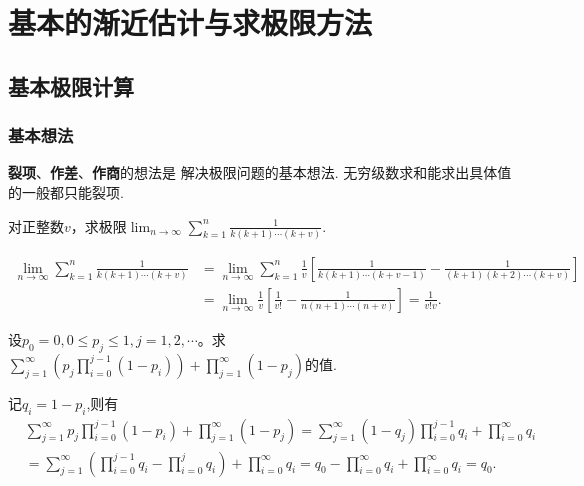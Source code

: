 \documentclass[../../main.tex]{subfiles}%
\begin{document}
\section{基本的渐近估计与求极限方法}

\subsection{基本极限计算}

\subsubsection{基本想法}

\textbf{裂项}、\textbf{作差}、\textbf{作商}的想法是
解决极限问题的基本想法.
无穷级数求和能求出具体值的一般都只能裂项.

\begin{example}
对正整数\(v\)，求极限\(\lim_{n\rightarrow\infty}\sum_{k = 1}^{n}\frac{1}{k(k + 1)\cdots(k + v)}\).
\end{example}
\begin{solution}

\begin{align*}
\lim_{n\rightarrow \infty} \sum_{k=1}^n{\frac{1}{k(k+1)\cdots (k+v)}}&=\lim_{n\rightarrow \infty} \sum_{k=1}^n{\frac{1}{v}\left[ \frac{1}{k\left( k+1 \right) \cdots \left( k+v-1 \right)}-\frac{1}{\left( k+1 \right) \left( k+2 \right) \cdots \left( k+v \right)} \right]}
\\
&=\lim_{n\rightarrow \infty} \frac{1}{v}\left[ \frac{1}{v!}-\frac{1}{n\left( n+1 \right) \cdots \left( n+v \right)} \right] =\frac{1}{v!v}.
\end{align*}

\end{solution}

\begin{example}
设\(p_0 = 0,0\leqslant  p_j\leqslant 1,j = 1,2,\cdots\)。求\(\sum_{j = 1}^{\infty}\left(p_j\prod_{i = 0}^{j - 1}(1 - p_i)\right)+\prod_{j = 1}^{\infty}(1 - p_j)\)的值.
\end{example}
\begin{solution}

记$q_i=1-p_i$,则有
\begin{align*}
&\sum_{j=1}^{\infty}{p_j\prod_{i=0}^{j-1}{\left( 1-p_i \right)}}+\prod_{j=1}^{\infty}{\left( 1-p_j \right)}=\sum_{j=1}^{\infty}{\left( 1-q_j \right) \prod_{i=0}^{j-1}{q_i}}+\prod_{i=0}^{\infty}{q_i}
\\
&=\sum_{j=1}^{\infty}{\left( \prod_{i=0}^{j-1}{q_i}-\prod_{i=0}^j{q_i} \right)}+\prod_{i=0}^{\infty}{q_i}=q_0-\prod_{i=0}^{\infty}{q_i}+\prod_{i=0}^{\infty}{q_i}=q_0.
\end{align*}

\end{solution}
\end{document}
